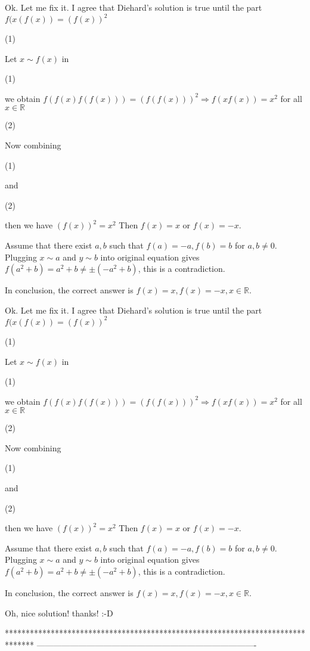 \begin{solution}
	Ok. Let me fix it.
I agree that Diehard's solution is true until the part $f(x(f(x))=(f(x))^2$  \begin{bolded}(1)\end{bolded}
Let $ x \sim f(x) $ in \begin{bolded}(1)\end{bolded} we obtain 
$ f(f(x)f(f(x)))=(f(f(x)))^2 \Rightarrow f(xf(x))=x^2 $ for all $x \in \mathbb{R} $ \begin{bolded}(2)\end{bolded}

Now combining \begin{bolded}(1)\end{bolded} and \begin{bolded}(2)\end{bolded} then we have
$ (f(x))^2 = x^2 $
Then $f(x)=x$ or $f(x)=-x$.

Assume that there exist $ a , b $ such that $f(a)=-a, f(b)=b $ for $a, b \neq 0$.
Plugging $ x \sim a$ and $ y \sim b$ into original equation gives
$ f(a^2+b)=a^2+b \neq \pm (-a^2+b) $, this is a contradiction.

In conclusion, the correct answer is 
$ \boxed{f(x)=x, f(x)=-x}, x \in \mathbb{R}$.
\end{solution}



\begin{solution}
	\begin{tcolorbox}Ok. Let me fix it.
I agree that Diehard's solution is true until the part $f(x(f(x))=(f(x))^2$  \begin{bolded}(1)\end{bolded}
Let $ x \sim f(x) $ in \begin{bolded}(1)\end{bolded} we obtain 
$ f(f(x)f(f(x)))=(f(f(x)))^2 \Rightarrow f(xf(x))=x^2 $ for all $x \in \mathbb{R} $ \begin{bolded}(2)\end{bolded}

Now combining \begin{bolded}(1)\end{bolded} and \begin{bolded}(2)\end{bolded} then we have
$ (f(x))^2 = x^2 $
Then $f(x)=x$ or $f(x)=-x$.

Assume that there exist $ a , b $ such that $f(a)=-a, f(b)=b $ for $a, b \neq 0$.
Plugging $ x \sim a$ and $ y \sim b$ into original equation gives
$ f(a^2+b)=a^2+b \neq \pm (-a^2+b) $, this is a contradiction.

In conclusion, the correct answer is 
$ \boxed{f(x)=x, f(x)=-x}, x \in \mathbb{R}$.\end{tcolorbox}

Oh, nice solution! thanks! :-D
\end{solution}
*******************************************************************************
-------------------------------------------------------------------------------

